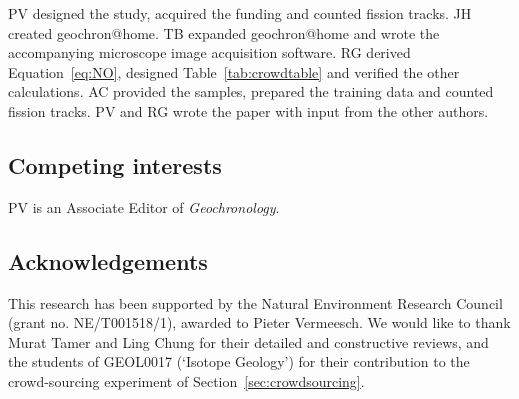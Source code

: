 \documentclass{article}
\begin{document}
PV designed the study, acquired the funding and counted fission
tracks. JH created geochron@home. TB expanded geochron@home and wrote
the accompanying microscope image acquisition software. RG derived
Equation~\ref{eq:NO}, designed Table~\ref{tab:crowdtable} and verified
the other calculations. AC provided the samples, prepared the training
data and counted fission tracks. PV and RG wrote the paper with input
from the other authors.

\subsection*{Competing interests}

PV is an Associate Editor of \emph{Geochronology}.

\subsection*{Acknowledgements}

This research has been supported by the Natural Environment Research
Council (grant no. NE/T001518/1), awarded to Pieter Vermeesch. We
would like to thank Murat Tamer and Ling Chung for their detailed and
constructive reviews, and the students of GEOL0017 (`Isotope Geology')
for their contribution to the crowd-sourcing experiment of
Section~\ref{sec:crowdsourcing}.



\end{document}
